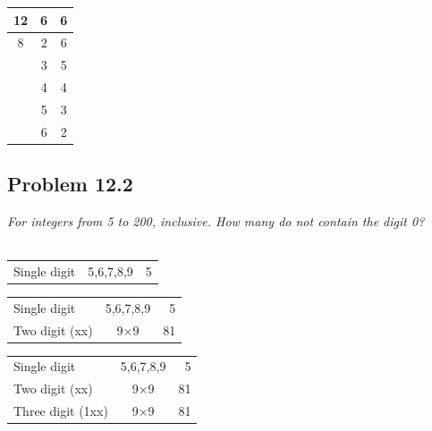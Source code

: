 \documentclass{beamer}
\begin{document}
\begin{frame}[c,shrink]{\subsecname}
\begin{overprint}
\begin{table}[tp]
\begin{tabular}{ccc}
                     12 	& 6	   & 6 	\\\hline
                     8 	& 2	   & 6 	\\
                      	& 3	   & 5 	\\
                      	& 4	   & 4 	\\
                      	& 5	   & 3 	\\
                      	& 6	   & 2 	\\\hline%
                \end{tabular}
            \end{table}
            \end{overprint}
        \end{frame}
        
        
        
    \subsection{Problem 12.2}
    
        \begin{frame}[c]{\subsecname}
            \textit{For integers from 5 to 200, inclusive. How many do not contain the digit 0?}\\
            $\;$\\
            \begin{overprint}
                \begin{tabular}{lcr}
                     Single digit		& 5,6,7,8,9 	& 5 	
                \end{tabular}            
                \begin{tabular}{lcr}
                     Single digit		& 5,6,7,8,9 	& 5 	\\
                     Two digit  (xx) 		& 9$\times$9 	& 81 	
                \end{tabular}   
                \begin{tabular}{lcr}
                     Single digit		& 5,6,7,8,9 	& 5 	\\
                     Two digit (xx)  		& 9$\times$9 	& 81 	\\
                     Three digit (1xx)  	& 9$\times$9 	& 81 	
                \end{tabular}   
            \end{overprint}
            $\;$\\
        \end{frame}
        
\end{document}
